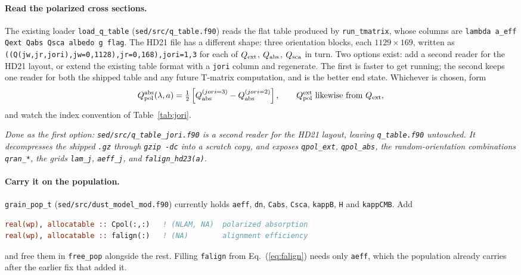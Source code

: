 \documentclass{my_memo}
\newcommand{\code}[1]{\texttt{#1}}
\begin{document}
\paragraph{Read the polarized cross sections.} The existing loader
\code{load\_q\_table} (\code{sed/src/q\_table.f90}) reads the flat table
produced by \code{run\_tmatrix}, whose columns are
\code{lambda a\_eff Qext Qabs Qsca albedo g flag}. The HD21 file has a
different shape: three orientation blocks, each
$1129 \times 169$, written as
\code{((Q(jw,jr,jori),jw=0,1128),jr=0,168),jori=1,3} for each of
$Q_{\rm ext}$, $Q_{\rm abs}$, $Q_{\rm sca}$ in turn. Two options exist:
add a second reader for the HD21 layout, or extend the existing table
format with a \code{jori} column and regenerate. The first is faster to
get running; the second keeps one reader for both the shipped table and
any future T-matrix computation, and is the better end state. Whichever
is chosen, form
%
\begin{equation}
Q_{\rm pol}^{\rm abs}(\lambda,a)
  = \tfrac{1}{2}\left[Q_{\rm abs}^{(jori=3)} - Q_{\rm abs}^{(jori=2)}\right],
\qquad
Q_{\rm pol}^{\rm ext} \ \hbox{likewise from } Q_{\rm ext},
\label{eq:qpolfromjori}
\end{equation}
%
and watch the index convention of Table~\ref{tab:jori}.

\emph{Done as the first option: \code{sed/src/q\_table\_jori.f90} is a
second reader for the HD21 layout, leaving \code{q\_table.f90}
untouched. It decompresses the shipped \code{.gz} through \code{gzip
-dc} into a scratch copy, and exposes \code{qpol\_ext}, \code{qpol\_abs},
the random-orientation combinations \code{qran\_*}, the grids
\code{lam\_j}, \code{aeff\_j}, and \code{falign\_hd23(a)}.}

\paragraph{Carry it on the population.} \code{grain\_pop\_t}
(\code{sed/src/dust\_model\_mod.f90}) currently holds \code{aeff},
\code{dn}, \code{Cabs}, \code{Csca}, \code{kappB}, \code{H} and
\code{kappCMB}. Add
%
\begin{lstlisting}[language=Fortran]
real(wp), allocatable :: Cpol(:,:)   ! (NLAM, NA)  polarized absorption
real(wp), allocatable :: falign(:)   ! (NA)        alignment efficiency
\end{lstlisting}
%
and free them in \code{free\_pop} alongside the rest. Filling
\code{falign} from Eq.~(\ref{eq:falign}) needs only \code{aeff}, which
the population already carries after the earlier fix that added it.
\end{document}
